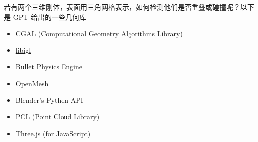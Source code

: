 

\begin{issues}
\issueDraft
\end{issues}

若有两个三维刚体，表面用三角网格表示，如何检测他们是否重叠或碰撞呢？以下是 GPT 给出的一些几何库

\begin{itemize}
\item \href{https://www.cgal.org/}{CGAL (Computational Geometry Algorithms Library)}
\item \href{https://libigl.github.io/}{libigl}
\item \href{https://pybullet.org/wordpress/}{Bullet Physics Engine}
\item \href{https://www.graphics.rwth-aachen.de/software/openmesh/}{OpenMesh}
\item Blender's Python API
\item \href{https://pointclouds.org/}{PCL (Point Cloud Library)}
\item \href{https://threejs.org/}{Three.js (for JavaScript)}
\end{itemize}
